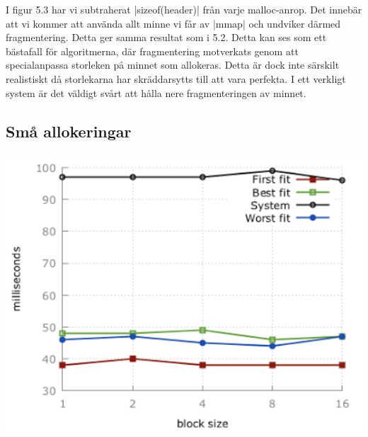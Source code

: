 \documentclass[paper=a4, fontsize=11pt]{scrartcl} %
\numberwithin{equation}{section} %
\numberwithin{figure}{section} %
\numberwithin{table}{section} %
\begin{document}
I figur 5.3 har vi subtraherat |sizeof(header)| från varje malloc-anrop.
Det innebär att vi kommer att använda allt minne vi får av |mmap| och undviker
därmed fragmentering. Detta ger samma resultat som i 5.2.
Detta kan ses som ett bästafall för algoritmerna, där fragmentering motverkats
genom att specialanpassa storleken på minnet som allokeras. Detta är dock inte
särskilt realistiskt då storlekarna har skräddarsytts till att vara perfekta.
I ett verkligt system är det väldigt svårt att hålla nere fragmenteringen
av minnet.


\subsection{Små allokeringar}

\begin{minipage}{.5\textwidth}
    \centering
    \includegraphics[width=1\textwidth]{images/time_plot_small1.png}
    \label{fig:small1}
\end{minipage}%
\end{document}
